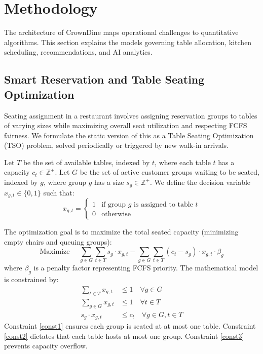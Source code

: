 \documentclass[pdflatex,sn-mathphys-num]{sn-jnl}%
\theoremstyle{thmstyleone}%
\theoremstyle{thmstyletwo}%
\theoremstyle{thmstylethree}%
\begin{document}
\section{Methodology}\label{sec3}

The architecture of CrownDine maps operational challenges to quantitative algorithms. This section explains the models governing table allocation, kitchen scheduling, recommendations, and AI analytics.

\subsection{Smart Reservation and Table Seating Optimization}
Seating assignment in a restaurant involves assigning reservation groups to tables of varying sizes while maximizing overall seat utilization and respecting FCFS fairness. We formulate the static version of this as a Table Seating Optimization (TSO) problem, solved periodically or triggered by new walk-in arrivals.

Let $T$ be the set of available tables, indexed by $t$, where each table $t$ has a capacity $c_t \in \mathbb{Z}^+$. Let $G$ be the set of active customer groups waiting to be seated, indexed by $g$, where group $g$ has a size $s_g \in \mathbb{Z}^+$. We define the decision variable $x_{g,t} \in \{0, 1\}$ such that:
\begin{equation}
x_{g,t} = \begin{cases}
1 & \text{if group } g \text{ is assigned to table } t \\
0 & \text{otherwise}
\end{cases}
\end{equation}

The optimization goal is to maximize the total seated capacity (minimizing empty chairs and queuing groups):
\begin{equation}
\text{Maximize } \quad \sum_{g \in G} \sum_{t \in T} s_g \cdot x_{g,t} - \sum_{g \in G} \sum_{t \in T} (c_t - s_g) \cdot x_{g,t} \cdot \beta_g
\end{equation}
where $\beta_g$ is a penalty factor representing FCFS priority. The mathematical model is constrained by:
\begin{align}
\sum_{t \in T} x_{g,t} &\le 1 \quad \forall g \in G \label{const1} \\
\sum_{g \in G} x_{g,t} &\le 1 \quad \forall t \in T \label{const2} \\
s_g \cdot x_{g,t} &\le c_t \quad \forall g \in G, t \in T \label{const3}
\end{align}
Constraint \eqref{const1} ensures each group is seated at at most one table. Constraint \eqref{const2} dictates that each table hosts at most one group. Constraint \eqref{const3} prevents capacity overflow.
\end{document}
